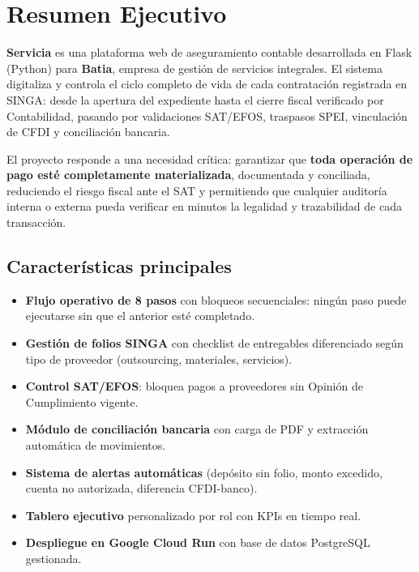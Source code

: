 \documentclass[12pt,a4paper]{article}
\begin{document}
\section{Resumen Ejecutivo}

\begin{infobox}
\textbf{Servicia} es una plataforma web de aseguramiento contable desarrollada en Flask
(Python) para \textbf{Batia}, empresa de gesti\'on de servicios integrales. El sistema
digitaliza y controla el ciclo completo de vida de cada contrataci\'on registrada en SINGA:
desde la apertura del expediente hasta el cierre fiscal verificado por Contabilidad,
pasando por validaciones SAT/EFOS, traspasos SPEI, vinculaci\'on de CFDI y conciliaci\'on
bancaria.
\end{infobox}

\bigskip

El proyecto responde a una necesidad cr\'itica: garantizar que \textbf{toda operaci\'on de
pago est\'e completamente materializada}, documentada y conciliada, reduciendo el riesgo
fiscal ante el SAT y permitiendo que cualquier auditor\'ia interna o externa pueda verificar
en minutos la legalidad y trazabilidad de cada transacci\'on.

\subsection*{Caracter\'isticas principales}

\begin{itemize}[leftmargin=1.5em]
  \item \textbf{Flujo operativo de 8 pasos} con bloqueos secuenciales: ning\'un paso puede
    ejecutarse sin que el anterior est\'e completado.
  \item \textbf{Gesti\'on de folios SINGA} con checklist de entregables diferenciado seg\'un
    tipo de proveedor (outsourcing, materiales, servicios).
  \item \textbf{Control SAT/EFOS}: bloquea pagos a proveedores sin Opini\'on de
    Cumplimiento vigente.
  \item \textbf{M\'odulo de conciliaci\'on bancaria} con carga de PDF y extracci\'on
    autom\'atica de movimientos.
  \item \textbf{Sistema de alertas autom\'aticas} (dep\'osito sin folio, monto excedido,
    cuenta no autorizada, diferencia CFDI-banco).
  \item \textbf{Tablero ejecutivo} personalizado por rol con KPIs en tiempo real.
  \item \textbf{Despliegue en Google Cloud Run} con base de datos PostgreSQL gestionada.
\end{itemize}
\end{document}
